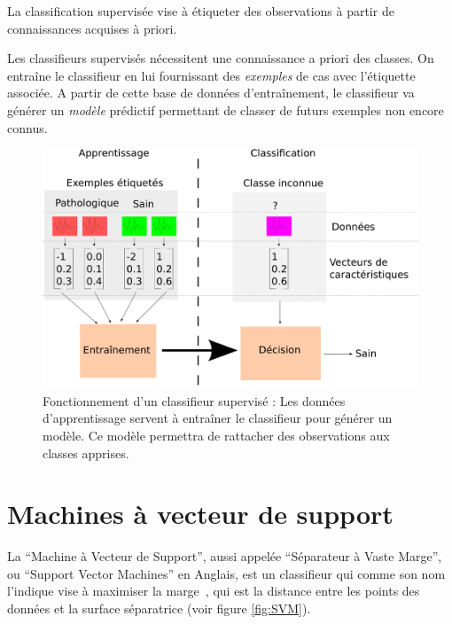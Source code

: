 La classification supervisée vise à étiqueter des observations à partir de connaissances acquises à priori.

Les classifieurs supervisés nécessitent une connaissance a priori des classes. On entraîne le classifieur en lui fournissant des \emph{exemples} de cas avec l'étiquette associée. A partir de cette base de données d'entraînement, le classifieur va générer un \emph{modèle} prédictif permettant de classer de futurs exemples non encore connus.

\begin{figure}[h]
	\begin{center}
	\includegraphics[width=15cm]{images/fonctionnementClassif}
	\end{center}
	\caption{Fonctionnement d'un classifieur supervisé : Les données d'apprentissage servent à entraîner le classifieur pour générer un modèle. Ce modèle permettra de rattacher des observations aux classes apprises.}
	\label{fig:fonctClassif}
\end{figure}


	\section{Machines à vecteur de support}

\label{lab:SVM}
La ``Machine à Vecteur de Support'', aussi appelée ``Séparateur à Vaste Marge'', ou ``Support Vector Machines'' en Anglais, est un classifieur qui comme son nom l'indique vise à maximiser la marge~\cite{boser1992training}, qui est la distance entre les points des données et la surface séparatrice (voir figure \ref{fig:SVM}).

